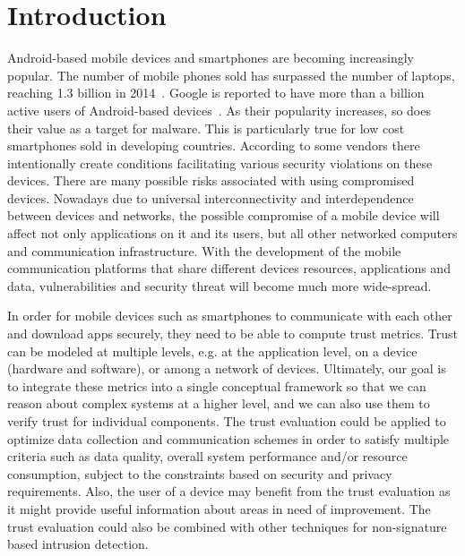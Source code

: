 \section{Introduction}

Android-based mobile devices and smartphones are becoming increasingly popular.  The number of mobile phones
sold has surpassed the number of laptops, reaching 1.3 billion in 
2014~\cite{market}.  Google is 
reported to have more than a billion active users of 
Android-based devices~\cite{android-users}.  
As their popularity increases, so does their value as
a target for malware.  
This is particularly true for low cost smartphones sold in developing countries. According to \cite{zheng2014droidray}
some vendors there intentionally create conditions facilitating various security violations on these devices.
 There are many possible risks associated with using compromised devices.  Nowadays due to universal interconnectivity and 
interdependence between devices and networks, the 
possible compromise of a mobile device will affect not only applications on it and its users, but all other 
networked computers and communication infrastructure.
With the development of the mobile communication platforms that share different devices resources, applications and data, 
vulnerabilities and security threat will become much more wide-spread. 

In order for mobile devices such as smartphones to communicate with each other and download apps securely,
they need to be able to compute trust metrics.   Trust can be modeled at 
multiple levels, e.g. at the application level, on a device (hardware and software), or among a network of devices.  Ultimately, our goal
is to integrate these metrics into a single conceptual framework so that we can reason about complex systems at a  
higher level, and we can also use them to verify trust for individual components.
The trust evaluation  could 
be applied to optimize data collection and communication schemes in order to satisfy multiple criteria such as 
data quality, overall
system performance and/or resource consumption, subject to the constraints based on security and privacy requirements.
Also, the user of a device may benefit from the trust evaluation as it might 
provide useful information about areas in need of improvement. The trust evaluation could also be combined with other techniques for
 non-signature based intrusion detection.

